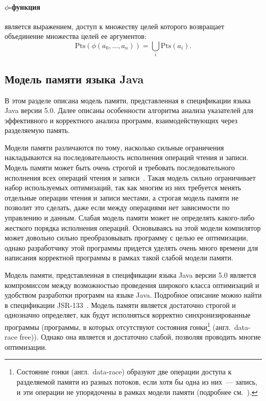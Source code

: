\documentclass[14pt,titlepage]{extarticle}
\newcommand{\Pts}[1]{\textrm{Pts}(#1)}
\let\oldphi\phi
\renewcommand{\phi}{\ensuremath{\oldphi}}
\newcommand{\eng}[1]{{\English#1}}
\newcommand{\engdef}[1]{(англ.~\eng{#1})}
\newcommand{\java}{\eng{Java}\xspace}
\begin{document}
        \paragraph{\phi-функция} является выражением, доступ к множеству целей
        которого возвращает объединение множества целей ее аргументов:
        \[\Pts{\phi(a_0, \ldots, a_n)} = \bigcup\limits_{i} \Pts{a_i}.\]

    \subsection{\texorpdfstring{Модель памяти языка \java}
                               {Модель памяти языка Java}}

      В этом разделе описана модель памяти, представленная в спецификации языка
      \java версии 5.0.
      Далее описаны особенности алгоритма анализа указателей для
      эффективного и корректного анализа программ, взаимодействующих через
      разделяемую память.

      Модели памяти различаются по тому, насколько сильные ограничения
      накладываются на последовательность исполнения операций чтения и
      записи.
      Модель памяти может быть очень строгой и требовать последовательного
      исполнения всех операций чтения и записи~\cite{lamport}.
      Такая модель сильно ограничивает набор используемых оптимизаций,
      так как многим из них требуется менять отдельные операции чтения и
      записи местами, а строгая модель памяти не позволит это сделать, даже
      если между операциями нет зависимости по управлению и данным.
      Слабая модель памяти может не определять какого-либо жесткого порядка
      исполнения операций. Основываясь на этой модели компилятор может
      довольно сильно преобразовывать программу с целью ее оптимизации,
      однако разработчику этой программы придется уделять очень много времени
      для написания корректной программы в рамках такой слабой модели памяти.

      Модель памяти, представленная в спецификации языка \java версии 5.0
      является компромиссом между возможностью проведения широкого класса
      оптимизаций и удобством разработки программ на языке \java. Подробное
      описание можно найти в спецификации JSR-133~\cite{jsr133}. Модель памяти
      является достаточно строгой и однозначно определяет, как будут
      исполняться корректно синхронизированные программы (программы, в которых
      отсутствуют состояния гонки\footnote{
        Состояние гонки \engdef{data-race} образуют две операции доступа к
        разделяемой памяти из разных потоков, если хотя бы одна из них~---
        запись, и эти операции не упорядочены в рамках модели памяти (подробнее
        см.~\cite[раздел~2.1]{manson_jmm}).
      } \engdef{data-race free}). Однако она является и достаточно слабой,
      позволяя проводить многие оптимизации.
\end{document}
